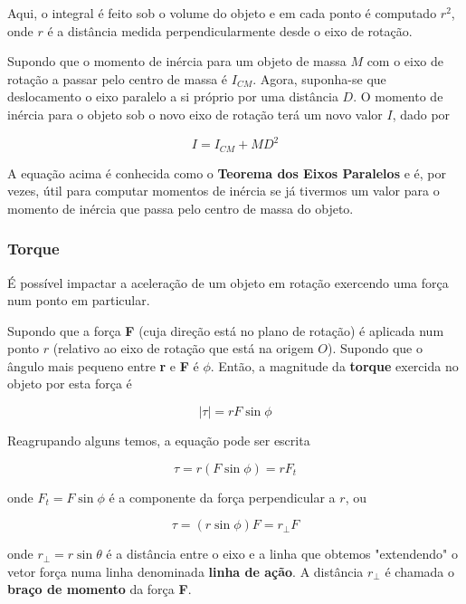 Aqui, o integral é feito sob o volume do objeto e em cada ponto é computado $r^2$, onde $r$ é a distância medida perpendicularmente desde o eixo de rotação.

Supondo que o momento de inércia para um objeto de massa $M$ com o eixo de rotação a passar pelo centro de massa é $I_{CM}$. Agora, suponha-se que deslocamento o eixo paralelo a si próprio por uma distância $D$. O momento de inércia para o objeto sob o novo eixo de rotação terá um novo valor $I$, dado por

\begin{equation}
    I=I_{CM}+MD^2
\end{equation}

A equação acima é conhecida como o \textbf{Teorema dos Eixos Paralelos} e é, por vezes, útil para computar momentos de inércia se já tivermos um valor para o momento de inércia que passa pelo centro de massa do objeto.

\subsubsection{Torque}
É possível impactar a aceleração de um objeto em rotação exercendo uma força num ponto em particular.

Supondo que a força \textbf{F} (cuja direção está no plano de rotação) é aplicada num ponto $r$ (relativo ao eixo de rotação que está na origem $O$). Supondo que o ângulo mais pequeno entre \textbf{r} e \textbf{F} é $\phi$. Então, a magnitude da \textbf{torque} exercida no objeto por esta força é

\begin{equation}
    |\tau|=rF\sin \phi
\end{equation}

Reagrupando alguns temos, a equação pode ser escrita

\begin{equation*}
    \tau=r(F\sin \phi)=rF_t
\end{equation*}

onde $F_t=F\sin \phi$ é a componente da força perpendicular a $r$, ou

\begin{equation*}
    \tau=(r\sin \phi)F=r_{\perp}F
\end{equation*}

onde $r_{\perp}=r\sin \theta$ é a distância entre o eixo e a linha que obtemos "extendendo" o vetor força numa linha denominada \textbf{linha de ação}. A distância $r_{\perp}$ é chamada o \textbf{braço de momento} da força \textbf{F}. 

